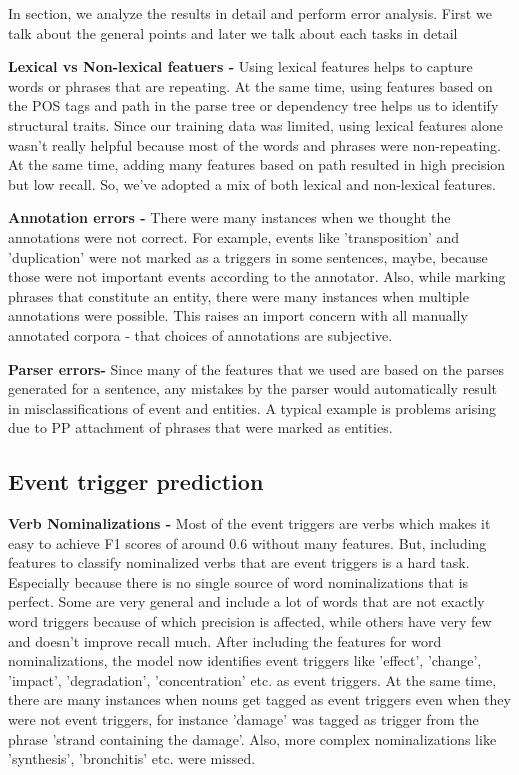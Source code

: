 In section, we analyze the results in detail and perform error analysis. First we talk about the general points and later we talk about each tasks in detail

{\bf Lexical vs Non-lexical featuers -} Using lexical features helps to capture words or phrases that are repeating. At the same time, using features based on the POS tags and path in the parse tree or dependency tree helps us to identify structural traits. Since our training data was limited, using lexical features alone wasn't really helpful because most of the words and phrases were non-repeating. At the same time, adding many features based on path resulted in high precision but low recall. So, we've adopted a mix of both lexical and non-lexical features.

{\bf Annotation errors -} There were many instances when we thought the annotations were not correct. For example, events like 'transposition' and 'duplication' were not marked as a triggers in some sentences, maybe, because those were not important events according to the annotator. Also, while marking phrases that constitute an entity, there were many instances when multiple annotations were possible. This raises an import concern with all manually annotated corpora - that choices of annotations are subjective.

{\bf Parser errors-} Since many of the features that we used are based on the parses generated for a sentence, any mistakes by the parser would automatically result in misclassifications of event and entities. A typical example is problems arising due to PP attachment of phrases that were marked as entities.

\subsection{Event trigger prediction}
{\bf Verb Nominalizations -} Most of the event triggers are verbs which makes it easy to achieve F1 scores of around 0.6 without many features. But, including features to classify nominalized verbs that are event triggers is a hard task. Especially because there is no single source of word nominalizations that is perfect. Some are very general and include a lot of words that are not exactly word triggers because of which precision is affected, while others have very few and doesn't improve recall much. After including the features for word nominalizations, the model now identifies event triggers like 'effect', 'change', 'impact', 'degradation', 'concentration' etc. as event triggers. At the same time, there are many instances when nouns get tagged as event triggers even when they were not event triggers, for instance 'damage' was tagged as trigger from the phrase 'strand containing the damage'. Also, more complex nominalizations like 'synthesis', 'bronchitis' etc. were missed.

